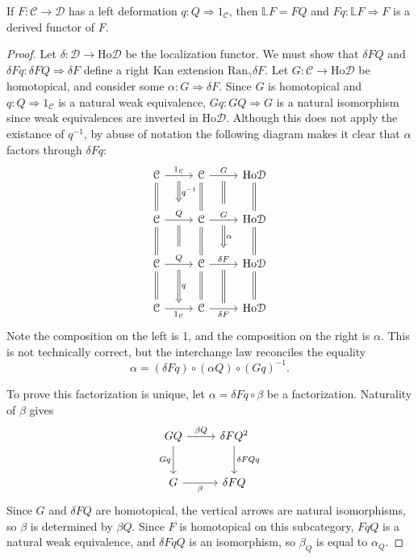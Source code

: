 \begin{proposition}\label{prp:10.3}
	If $F : \mathcal{C}  \to \mathcal{D} $ has a left deformation $q : Q \Rightarrow 1_\mathcal{C} $, then $\mathbb{L} F=FQ$ and $Fq : \mathbb{L} F \Rightarrow F$ is a derived functor of $F$.
\end{proposition}
\begin{proof}
	Let $\delta : \mathcal{D}  \to \mathrm{Ho} \mathcal{D} $ be the localization functor. We must show that $\delta FQ$ and $\delta Fq : \delta FQ \Rightarrow \delta F$ define a right Kan extension $\mathrm{Ran}_{\gamma} \delta F$. Let $G : \mathcal{C}  \to \mathrm{Ho} \mathcal{D} $ be homotopical, and consider some $\alpha : G \Rightarrow \delta F$. Since $G$ is homotopical and $q : Q \Rightarrow 1_{\mathcal{C} } $ is a natural weak equivalence, $Gq : GQ \Rightarrow G$ is a natural isomorphism	since weak equivalences are inverted in $\mathrm{Ho} \mathcal{D} $. Although this does not apply the existance  of $q^{-1} $, by abuse of notation the following diagram makes it clear that $\alpha$ factors through $\delta Fq$:
	\[\begin{tikzcd}[row sep = 2.5em, column sep = 2.5em]
		\mathcal{C} \ar[" 1_\mathcal{C}  "{name=1C1}, r] \ar[equals, d]  & \mathcal{C}\ar[" G "{name=G1}, r] \ar[equals, d]   & \mathrm{Ho} \mathcal{D} \ar[equals, d]  \\
		\mathcal{C} \ar[" Q "{name=Q1}, r] \ar[equals, d]  & \mathcal{C} \ar[" G "{name=G2}, r] \ar[equals, d]  & \mathrm{Ho} \mathcal{D} \ar[equals, d]  \\
		\mathcal{C} \ar[" Q  "{name=Q2}, r]\ar[equals, d]  & \mathcal{C} \ar[" \delta F "{name=dF1}, r]\ar[equals, d]   & \mathrm{Ho} \mathcal{D}\ar[equals, d] \\
		\mathcal{C} \ar[" 1_{\mathcal{C} }  "'{name=1C2}, r] & \mathcal{C} \ar[" \delta F "'{name=dF2}, r] & \mathrm{Ho} \mathcal{D} 
		\arrow[from=1C1, to=Q1, Rightarrow, " q^{-1}  ", shorten=5pt] \arrow[from=Q1, to=Q2, equals, shorten=5pt] \arrow[from=Q2, to=1C2, " q ", Rightarrow, shorten=5pt]
		\arrow[from=G1, to=G2, equals, shorten=5pt] \arrow[from=G2, to=dF1, Rightarrow, " \alpha ", shorten=5pt] \arrow[from=dF1, to=dF2, equals, shorten=5pt] 
	\end{tikzcd}\]
	Note the composition on the left is 1, and the composition on the right is $\alpha$. This is not technically correct, but the interchange law reconciles the equality
	\[
		\alpha = (\delta Fq)\circ (\alpha Q)\circ (Gq)^{-1} 
	.\]
	
	To prove this factorization is unique, let $\alpha = \delta Fq \circ \beta$ be a factorization. Naturality of $\beta$ gives
	\[\begin{tikzcd}[row sep = 2.5em, column sep = 2.5em]
	GQ \ar[" \beta Q ", r] \ar[" Gq "', d]  & \delta FQ^2 \ar[" \delta FQq ", d]  \\
	G \ar[" \beta "', r]  & \delta FQ
	\end{tikzcd}\]
	Since $G$ and $\delta FQ$ are homotopical, the vertical arrows are natural isomorphisms, so $\beta$ is determined by $\beta Q$. Since $F$ is homotopical on this subcategory, $FqQ$ is a natural weak equivalence, and $\delta FqQ$ is an isomorphism, so $\beta_Q$ is equal to $\alpha_Q$.
\end{proof}

